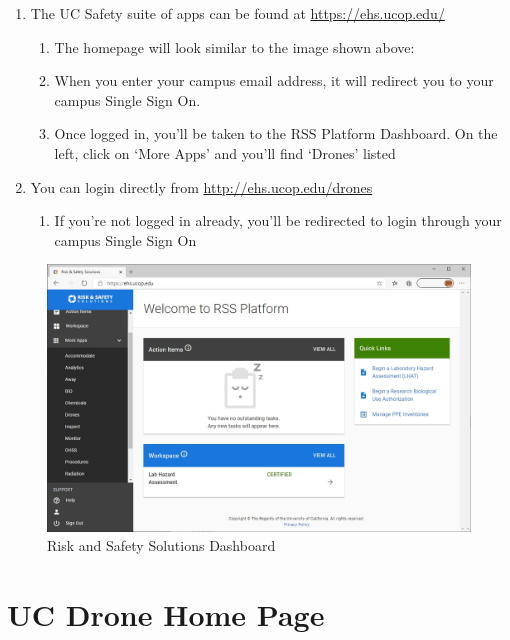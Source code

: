 \documentclass[
  12pt,
]{book}
\providecommand{\tightlist}{%
  \setlength{\itemsep}{0pt}\setlength{\parskip}{0pt}}
\begin{document}
\begin{enumerate}
\def\labelenumi{\arabic{enumi}.}
\tightlist
\item
  The UC Safety suite of apps can be found at \url{https://ehs.ucop.edu/}

  \begin{enumerate}
  \def\labelenumii{\arabic{enumii}.}
  \tightlist
  \item
    The homepage will look similar to the image shown above:
  \item
    When you enter your campus email address, it will redirect you to your campus Single Sign On.
  \item
    Once logged in, you'll be taken to the RSS Platform Dashboard. On the left, click on `More Apps' and you'll find `Drones' listed
  \end{enumerate}
\item
  You can login directly from \url{http://ehs.ucop.edu/drones}

  \begin{enumerate}
  \def\labelenumii{\arabic{enumii}.}
  \tightlist
  \item
    If you're not logged in already, you'll be redirected to login through your campus Single Sign On
  \end{enumerate}
\end{enumerate}

\begin{figure}

{\centering \includegraphics[width=0.85\linewidth]{images/RSS_apps} 

}

\caption{Risk and Safety Solutions Dashboard}\label{fig:rss-dash}
\end{figure}

\hypertarget{UCDrones-home}{%
\section{UC Drone Home Page}\label{UCDrones-home}}
\end{document}
